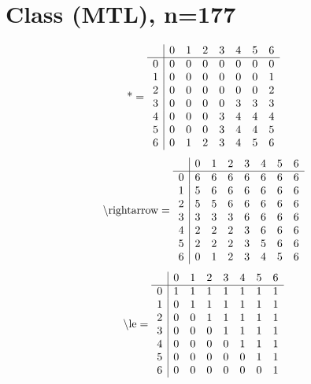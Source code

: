\documentclass[11pt]{article}
\begin{document}
\section{Class (MTL), n=177}
\[\text{*} = 
\begin{array}{r | r r r r r r r}
 & 0 & 1 & 2 & 3 & 4 & 5 & 6 \\ \hline
0 & 0 & 0 & 0 & 0 & 0 & 0 & 0 \\
1 & 0 & 0 & 0 & 0 & 0 & 0 & 1 \\
2 & 0 & 0 & 0 & 0 & 0 & 0 & 2 \\
3 & 0 & 0 & 0 & 0 & 3 & 3 & 3 \\
4 & 0 & 0 & 0 & 3 & 4 & 4 & 4 \\
5 & 0 & 0 & 0 & 3 & 4 & 4 & 5 \\
6 & 0 & 1 & 2 & 3 & 4 & 5 & 6 \\
\end{array}
\]
\[\text{\textbackslash rightarrow} = 
\begin{array}{r | r r r r r r r}
 & 0 & 1 & 2 & 3 & 4 & 5 & 6 \\ \hline
0 & 6 & 6 & 6 & 6 & 6 & 6 & 6 \\
1 & 5 & 6 & 6 & 6 & 6 & 6 & 6 \\
2 & 5 & 5 & 6 & 6 & 6 & 6 & 6 \\
3 & 3 & 3 & 3 & 6 & 6 & 6 & 6 \\
4 & 2 & 2 & 2 & 3 & 6 & 6 & 6 \\
5 & 2 & 2 & 2 & 3 & 5 & 6 & 6 \\
6 & 0 & 1 & 2 & 3 & 4 & 5 & 6 \\
\end{array}
\]
\[\text{\textbackslash le} = 
\begin{array}{r | r r r r r r r}
 & 0 & 1 & 2 & 3 & 4 & 5 & 6 \\ \hline
0 & 1 & 1 & 1 & 1 & 1 & 1 & 1 \\
1 & 0 & 1 & 1 & 1 & 1 & 1 & 1 \\
2 & 0 & 0 & 1 & 1 & 1 & 1 & 1 \\
3 & 0 & 0 & 0 & 1 & 1 & 1 & 1 \\
4 & 0 & 0 & 0 & 0 & 1 & 1 & 1 \\
5 & 0 & 0 & 0 & 0 & 0 & 1 & 1 \\
6 & 0 & 0 & 0 & 0 & 0 & 0 & 1 \\
\end{array}
\]
\end{document}
